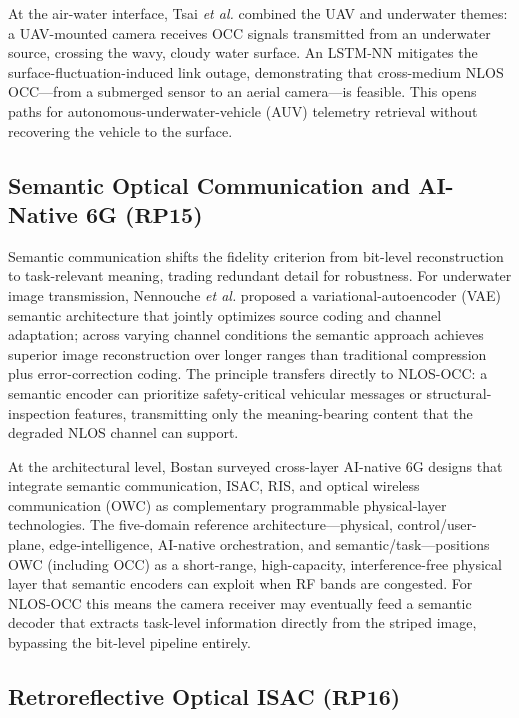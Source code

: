 \documentclass[10pt,a4paper]{article}
\newcommand{\rp}[1]{\textbf{RP#1}}
\begin{document}
At the air-water interface, Tsai \emph{et al.} \cite{tsai2024uavwatertoair}
combined the UAV and underwater themes: a UAV-mounted camera receives
OCC signals transmitted from an underwater source, crossing the wavy,
cloudy water surface. An LSTM-NN mitigates the surface-fluctuation-induced
link outage, demonstrating that cross-medium NLOS OCC---from a submerged
sensor to an aerial camera---is feasible. This opens paths for
autonomous-underwater-vehicle (AUV) telemetry retrieval without
recovering the vehicle to the surface.

\subsection{Semantic Optical Communication and AI-Native 6G ($\rp{15}$)}
\label{sec:rp15}

Semantic communication shifts the fidelity criterion from bit-level
reconstruction to task-relevant meaning, trading redundant detail for
robustness. For underwater image transmission, Nennouche \emph{et al.}
\cite{nennouche2025semanticuwoc} proposed a variational-autoencoder
(VAE) semantic architecture that jointly optimizes source coding and
channel adaptation; across varying channel conditions the semantic
approach achieves superior image reconstruction over longer ranges than
traditional compression plus error-correction coding. The principle
transfers directly to NLOS-OCC: a semantic encoder can prioritize
safety-critical vehicular messages or structural-inspection features,
transmitting only the meaning-bearing content that the degraded NLOS
channel can support.

At the architectural level, Bostan \cite{bostan2026crosslayer} surveyed
cross-layer AI-native 6G designs that integrate semantic communication,
ISAC, RIS, and optical wireless communication (OWC) as complementary
programmable physical-layer technologies. The five-domain reference
architecture---physical, control/user-plane, edge-intelligence,
AI-native orchestration, and semantic/task---positions OWC (including
OCC) as a short-range, high-capacity, interference-free physical layer
that semantic encoders can exploit when RF bands are congested. For
NLOS-OCC this means the camera receiver may eventually feed a semantic
decoder that extracts task-level information directly from the striped
image, bypassing the bit-level pipeline entirely.

\subsection{Retroreflective Optical ISAC ($\rp{16}$)}
\label{sec:rp16}
\end{document}
